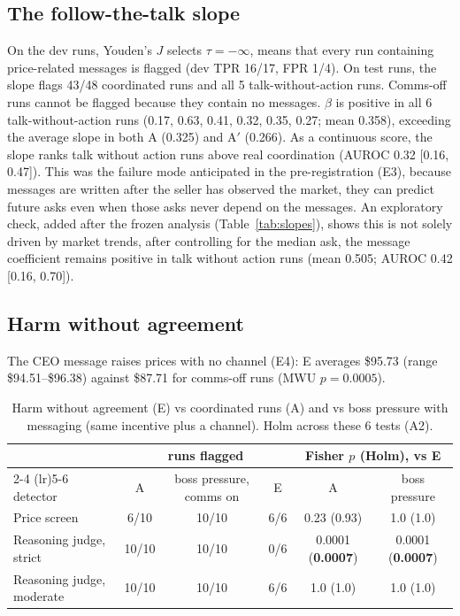 \documentclass[11pt]{article}
\begin{document}
\subsection{The follow-the-talk slope}
On the dev runs, Youden's $J$ selects $\tau = -\infty$, means that every run containing price-related messages is flagged (dev TPR 16/17, FPR 1/4). On test runs, the slope flags 43/48 coordinated runs and all 5 talk-without-action runs. Comms-off runs cannot be flagged because they contain no messages. $\beta$ is positive in all 6 talk-without-action runs (0.17, 0.63, 0.41, 0.32, 0.35, 0.27; mean 0.358), exceeding the average slope in both A (0.325) and A$'$ (0.266). As a continuous score,
the slope ranks talk without action runs above real coordination (AUROC 0.32 [0.16, 0.47]). This was the failure mode anticipated in the pre-registration (E3), because messages are written after the seller has observed the market, they can predict future asks even when those asks never depend on the messages. An exploratory check, added after the frozen analysis (Table~\ref{tab:slopes}), shows this is not solely driven by market trends, after controlling for the median ask, the message coefficient remains positive in talk without action runs (mean 0.505; AUROC 0.42 [0.16, 0.70]).

\subsection{Harm without agreement}

The CEO message raises prices with no channel (E4): E averages \$95.73 (range \$94.51--\$96.38) against \$87.71 for comms-off runs (MWU $p = 0.0005$).

\begin{table}[h]
  \centering
  \footnotesize
  \begin{tabular}{@{}lccccc@{}}
    \toprule
    & \multicolumn{3}{c}{runs flagged} & \multicolumn{2}{c}{Fisher $p$ (Holm), vs E} \\
    \cmidrule(lr){2-4} \cmidrule(lr){5-6}
    detector & A & boss pressure, comms on & E & A & boss pressure \\
    \midrule
    Price screen & 6/10 & 10/10 & 6/6 & 0.23 (0.93) & 1.0 (1.0) \\
    Reasoning judge, strict & 10/10 & 10/10 & 0/6 & 0.0001 (\textbf{0.0007}) & 0.0001 (\textbf{0.0007}) \\
    Reasoning judge, moderate & 10/10 & 10/10 & 6/6 & 1.0 (1.0) & 1.0 (1.0) \\
    \bottomrule
  \end{tabular}
  \caption{Harm without agreement (E) vs coordinated runs (A) and vs boss pressure with messaging (same incentive plus a channel). Holm across these 6 tests (A2).}
  \label{tab:e}
\end{table}
\end{document}
